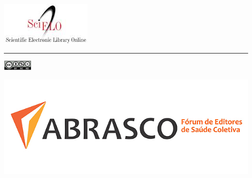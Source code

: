 \documentclass[scielo,showtrims,times,12pt,trimframe,conselho,spreadimages]{memoir}
\begin{document}
\thispagestyle{plain}
\hspace{-25mm}\noindent\includegraphics[width=.25\textwidth]{logo1.jpg}
\begin{minipage}{4cm}
\vspace{-1cm}
\tiny\revista\par\site\par
\vspace{-1ex}\rule{4cm}{1pt}
\includegraphics[width=15mm]{ccbynp.jpg}
\end{minipage}
\hspace{60mm}\includegraphics[width=.2\textwidth]{logo2.jpg}
\vspace{2cm}

\begin{center}
\titulo

\medskip

\begin{bfseries}
\subtit
\end{bfseries}

\medskip

\autor
\end{center}
\medskip

\noindent 
{}
\medskip



\absleftindent=0pt 
\absrightindent=0pt

\makeatletter
\renewenvironment{abstract}{\noindent\textbf{\abstractname}:\quad}{}
\makeatother
\end{document}
